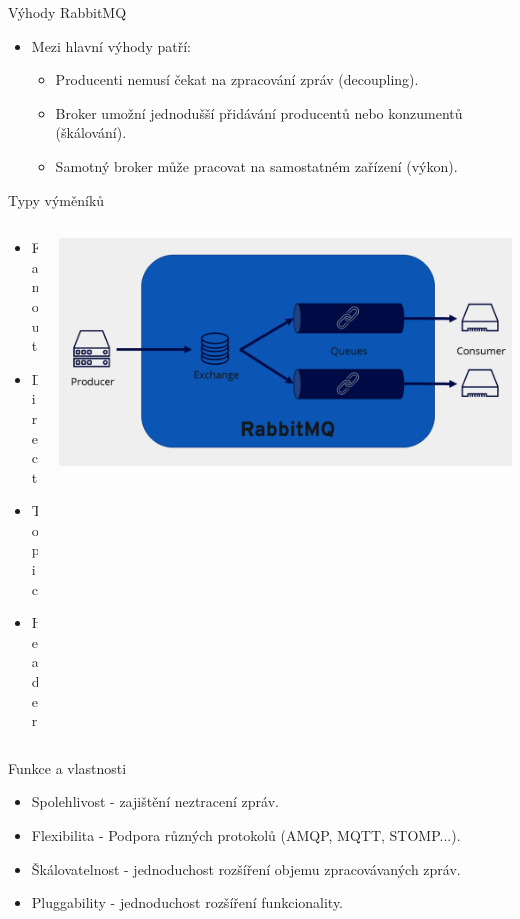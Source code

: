 \documentclass{beamer}
\begin{document}
\begin{frame}{Výhody RabbitMQ}
	\begin{itemize}
		\item Mezi hlavní výhody patří:
			\begin{itemize}
				\item [\textendash] Producenti nemusí čekat na zpracování zpráv (decoupling).
				\item [\textendash] Broker umožní jednodušší přidávání producentů nebo											  konzumentů (škálování).
				\item [\textendash] Samotný broker může pracovat na samostatném zařízení (výkon).
			\end{itemize}
	\end{itemize}
\end{frame}

\begin{frame}{Typy výměníků}
	\begin{columns}
    \begin{column}{0.2\textwidth}
      \begin{itemize}
        \item Fanout
        \item Direct
        \item Topic
        \item Header
      \end{itemize}
    \end{column}
    
    \begin{column}{0.8\textwidth}
      \centering
      \includegraphics[width=\textwidth]{rabbitmq.png}
    \end{column}
  \end{columns}
\end{frame}

\begin{frame}{Funkce a vlastnosti}
	\begin{itemize}
		\item Spolehlivost - zajištění neztracení zpráv.
		\item Flexibilita - Podpora různých protokolů (AMQP, MQTT, STOMP...).
		\item Škálovatelnost - jednoduchost rozšíření objemu zpracovávaných zpráv.
		\item Pluggability - jednoduchost rozšíření funkcionality.
	\end{itemize}
\end{frame}
\end{document}
